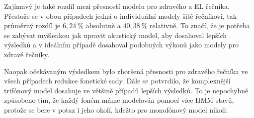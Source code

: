 Zajímavý je také rozdíl mezi přesností modelu pro zdravého a EL řečníka. Přestože se v obou případech jedná o individuální modely šité  řečníkovi, tak průměrný rozdíl je $6,24\ \%$ absolutně a $40,38\ \%$ relativně. To značí, že je potřeba se zabývat myšlenkou jak upravit akustický model, aby dosahoval lepších výsledků a v ideálním případě dosahoval podobných výkonů jako modely pro zdravé řečníky.

Naopak očekávaným výsledkem bylo zhoršená přesnosti pro zdravého řečníka ve všech případech redukce fonetické sady. Dále se potvrdilo, že komplexnější trifónový model dosahuje ve většině případů lepších výsledků. To je nepochybně způsobeno tím, že každý foném máme modelován pomocí více HMM stavů, protože se bere v potaz i jeho okolí, kdežto pro monofónový model nikoli.
